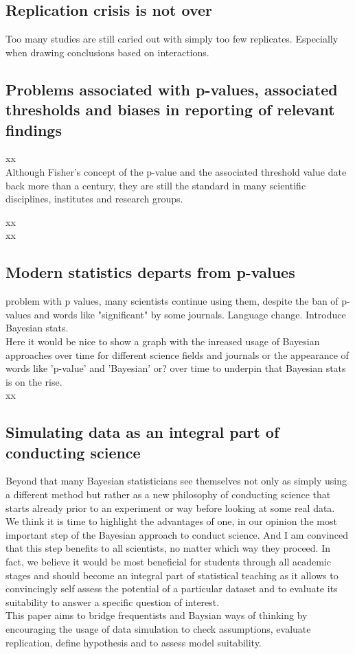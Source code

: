 \documentclass{article}
\begin{document}
\subsection*{Replication crisis is not over}
Too many studies are still caried out with simply too few replicates. Especially when drawing conclusions based on interactions. \\
\subsection*{Problems associated with p-values, associated thresholds and biases in reporting of relevant findings}
xx\\Although Fisher's concept of the p-value and the associated threshold value date back more than a century, they are still the standard in many scientific disciplines, institutes and research groups. 

xx\\
xx\\
\subsection*{Modern statistics departs from p-values}
problem with p values, many scientists continue using them, despite the ban of p-values and words like "significant" by some journals.
Language change.
Introduce Bayesian stats.\\

Here it would be nice to show a graph with the inreased usage of Bayesian approaches over time for different science fields and journals or the appearance of words like 'p-value' and 'Bayesian' or? over time to underpin that Bayesian stats is on the rise.\\

xx\\ 

\subsection*{Simulating data as an integral part of conducting science}
Beyond that many Bayesian statisticians see themselves not only as simply using a different method but rather as a new philosophy of conducting science that starts already prior to an experiment or way before looking at some real data.\\

We think it is time to highlight the advantages of one, in our opinion the most important step of the Bayesian approach to conduct science. And I am convinced that this step benefits to all scientists, no matter which way they proceed. In fact, we believe it would be most beneficial for students through all academic stages and should become an integral part of statistical teaching as it allows to convincingly self assess the potential of a particular dataset and to evaluate its suitability to answer a specific question of interest.\\
This paper aims to bridge frequentists and Baysian ways of thinking by encouraging the usage of data simulation to check assumptions, evaluate replication, define hypothesis and to assess model suitability.
\end{document}
